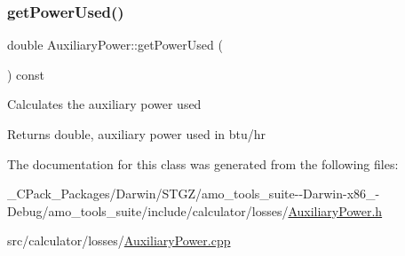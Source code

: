 \subsubsection{\texorpdfstring{get\+Power\+Used()}{getPowerUsed()}\hspace{0.1cm}{\footnotesize\ttfamily [3/3]}}
{\footnotesize\ttfamily double Auxiliary\+Power\+::get\+Power\+Used (\begin{DoxyParamCaption}{ }\end{DoxyParamCaption}) const}

Calculates the auxiliary power used

\begin{DoxyReturn}{Returns}
double, auxiliary power used in btu/hr 
\end{DoxyReturn}


The documentation for this class was generated from the following files\+:\begin{DoxyCompactItemize}
\item 
\+\_\+\+C\+Pack\+\_\+\+Packages/\+Darwin/\+S\+T\+G\+Z/amo\+\_\+tools\+\_\+suite-\/-\/\+Darwin-\/x86\+\_-\/\+Debug/amo\+\_\+tools\+\_\+suite/include/calculator/losses/\hyperlink{___c_pack___packages_2_darwin_2_s_t_g_z_2amo__tools__suite--_darwin-x86__64-_debug_2amo__tools__c4f23f25f536f732e5fa703f6bc0dbc9}{Auxiliary\+Power.\+h}\item 
src/calculator/losses/\hyperlink{_auxiliary_power_8cpp}{Auxiliary\+Power.\+cpp}\end{DoxyCompactItemize}
